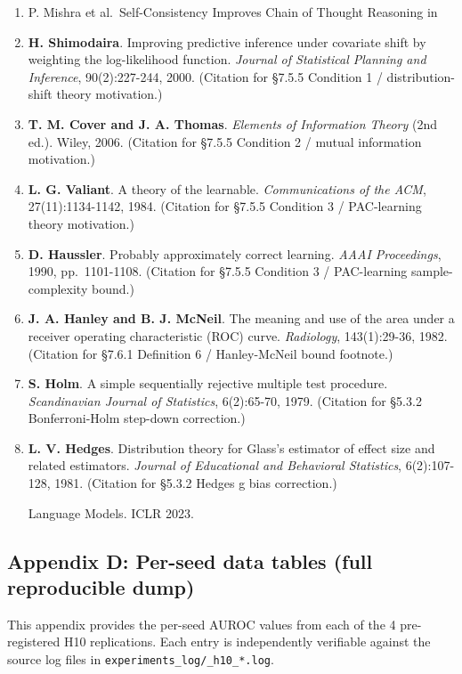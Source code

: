 \documentclass[11pt]{article}
\begin{document}
\begin{enumerate}
  Language Models. NeurIPS 2022.
\item
  P. Mishra et al.~Self-Consistency Improves Chain of Thought Reasoning
  in
\item
  \textbf{H. Shimodaira}. Improving predictive inference under covariate
  shift by weighting the log-likelihood function. \emph{Journal of
  Statistical Planning and Inference}, 90(2):227-244, 2000. (Citation
  for §7.5.5 Condition 1 / distribution-shift theory motivation.)
\item
  \textbf{T. M. Cover and J. A. Thomas}. \emph{Elements of Information
  Theory} (2nd ed.). Wiley, 2006. (Citation for §7.5.5 Condition 2 /
  mutual information motivation.)
\item
  \textbf{L. G. Valiant}. A theory of the learnable.
  \emph{Communications of the ACM}, 27(11):1134-1142, 1984. (Citation
  for §7.5.5 Condition 3 / PAC-learning theory motivation.)
\item
  \textbf{D. Haussler}. Probably approximately correct learning.
  \emph{AAAI Proceedings}, 1990, pp.~1101-1108. (Citation for §7.5.5
  Condition 3 / PAC-learning sample-complexity bound.)
\item
  \textbf{J. A. Hanley and B. J. McNeil}. The meaning and use of the
  area under a receiver operating characteristic (ROC) curve.
  \emph{Radiology}, 143(1):29-36, 1982. (Citation for §7.6.1 Definition
  6 / Hanley-McNeil bound footnote.)
\item
  \textbf{S. Holm}. A simple sequentially rejective multiple test
  procedure. \emph{Scandinavian Journal of Statistics}, 6(2):65-70,
  1979. (Citation for §5.3.2 Bonferroni-Holm step-down correction.)
\item
  \textbf{L. V. Hedges}. Distribution theory for Glass's estimator of
  effect size and related estimators. \emph{Journal of Educational and
  Behavioral Statistics}, 6(2):107-128, 1981. (Citation for §5.3.2
  Hedges g bias correction.)

  Language Models. ICLR 2023.
\end{enumerate}

\subsection{Appendix D: Per-seed data tables (full reproducible
dump)}\label{appendix-d-per-seed-data-tables-full-reproducible-dump}

This appendix provides the per-seed AUROC values from each of the 4
pre-registered H10 replications. Each entry is independently verifiable
against the source log files in \texttt{experiments\_log/\_h10\_*.log}.
\end{document}
